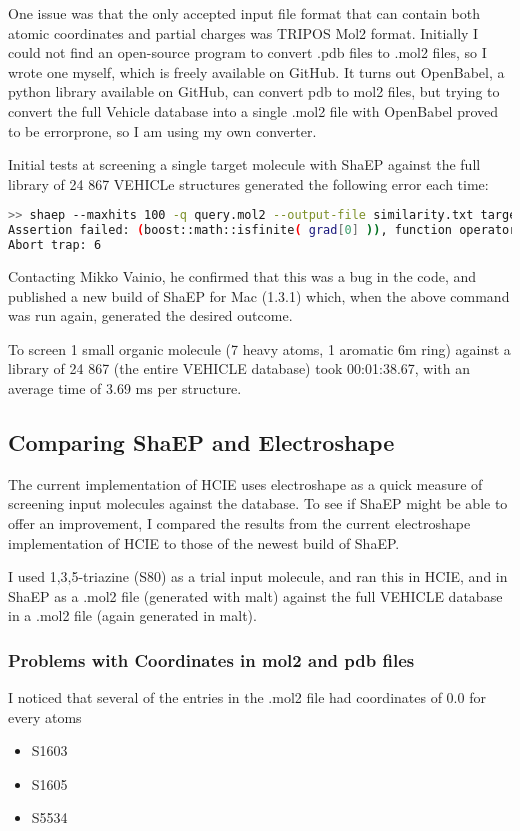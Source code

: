 \documentclass[11pt]{article} %
\begin{document}
One issue was that the only accepted input file format that can contain both atomic coordinates and partial charges was TRIPOS Mol2 format. Initially I could not find an open-source program to convert .pdb files to .mol2 files, so I wrote one myself, which is freely available on GitHub. It turns out OpenBabel, a python library available on GitHub, can convert pdb to mol2 files, but trying to convert the full Vehicle database into a single .mol2 file with OpenBabel proved to be errorprone, so I am using my own converter.

Initial tests at screening a single target molecule with ShaEP against the full library of 24 867 VEHICLe structures generated the following error each time:

\begin{lstlisting}[language=bash]
>> shaep --maxhits 100 -q query.mol2 --output-file similarity.txt target_library.mol2
Assertion failed: (boost::math::isfinite( grad[0] )), function operator(), file /Users/runner/runners/2.165.0/work/1/s/include/overlapper.icc, line 265.
Abort trap: 6
\end{lstlisting}

Contacting Mikko Vainio, he confirmed that this was a bug in the code, and published a new build of ShaEP for Mac (1.3.1) which, when the above command was run again, generated the desired outcome.

To screen 1 small organic molecule (7 heavy atoms, 1 aromatic 6m ring) against a library of 24 867 (the entire VEHICLE database) took 00:01:38.67, with an average time of 3.69 ms per structure.

\subsection{Comparing ShaEP and Electroshape}
The current implementation of HCIE uses electroshape as a quick measure of screening input molecules against the database. To see if ShaEP might be able to offer an improvement, I compared the results from the current electroshape implementation of HCIE to those of the newest build of ShaEP.

I used 1,3,5-triazine (S80) as a trial input molecule, and ran this in HCIE, and in ShaEP as a .mol2 file (generated with malt) against the full VEHICLE database in a .mol2 file (again generated in malt).

\subsubsection{Problems with Coordinates in mol2 and pdb files}
I noticed that several of the entries in the .mol2 file had coordinates of 0.0 for every atoms
\begin{itemize}
\item S1603
\item S1605
\item S5534
\end{itemize}
\end{document}
